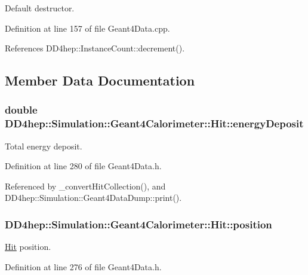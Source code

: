 Default destructor. 

Definition at line 157 of file Geant4Data.cpp.

References DD4hep::InstanceCount::decrement().

\subsection{Member Data Documentation}
\hypertarget{class_d_d4hep_1_1_simulation_1_1_geant4_calorimeter_1_1_hit_a5d9a6b22529494a8b8e4a9f3f8df9162}{
\subsubsection[{energyDeposit}]{\setlength{\rightskip}{0pt plus 5cm}double {\bf DD4hep::Simulation::Geant4Calorimeter::Hit::energyDeposit}}}
\label{class_d_d4hep_1_1_simulation_1_1_geant4_calorimeter_1_1_hit_a5d9a6b22529494a8b8e4a9f3f8df9162}


Total energy deposit. 

Definition at line 280 of file Geant4Data.h.

Referenced by \_\-convertHitCollection(), and DD4hep::Simulation::Geant4DataDump::print().\hypertarget{class_d_d4hep_1_1_simulation_1_1_geant4_calorimeter_1_1_hit_acab4633ca2b899307b1bbb47a22f0e74}{
\subsubsection[{position}]{ {\bf DD4hep::Simulation::Geant4Calorimeter::Hit::position}}}
\label{class_d_d4hep_1_1_simulation_1_1_geant4_calorimeter_1_1_hit_acab4633ca2b899307b1bbb47a22f0e74}


\hyperlink{class_d_d4hep_1_1_simulation_1_1_geant4_calorimeter_1_1_hit}{Hit} position. 

Definition at line 276 of file Geant4Data.h.

